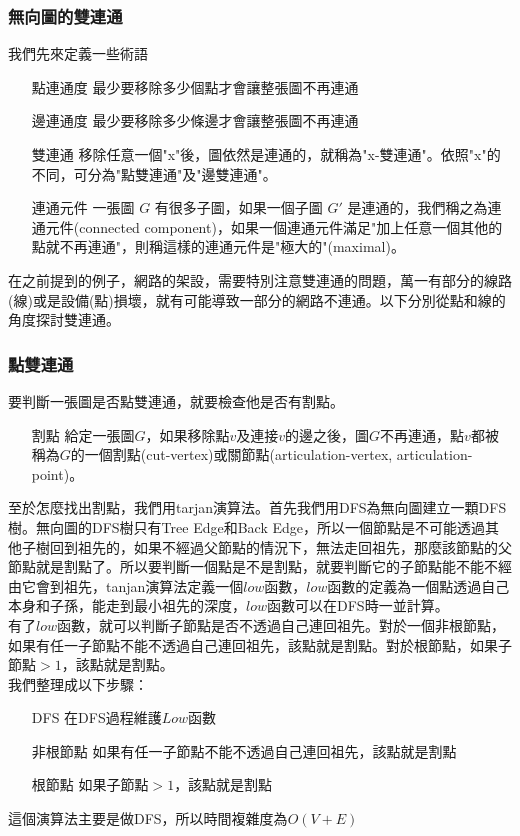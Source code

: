 \subsubsection{無向圖的雙連通}
我們先來定義一些術語
\begin{enumerate}
\item [點連通度] 最少要移除多少個點才會讓整張圖不再連通
\item [邊連通度] 最少要移除多少條邊才會讓整張圖不再連通
\item [雙連通] 移除任意一個"x"後，圖依然是連通的，就稱為"x-雙連通"。依照"x"的不同，可分為"點雙連通"及"邊雙連通"。
\item [連通元件] 一張圖 $G$ 有很多子圖，如果一個子圖 $G'$ 是連通的，我們稱之為連通元件(connected component)，如果一個連通元件滿足"加上任意一個其他的點就不再連通"，則稱這樣的連通元件是"極大的"(maximal)。
\end{enumerate}
在之前提到的例子，網路的架設，需要特別注意雙連通的問題，萬一有部分的線路(線)或是設備(點)損壞，就有可能導致一部分的網路不連通。以下分別從點和線的角度探討雙連通。
\subsubsection{點雙連通}
要判斷一張圖是否點雙連通，就要檢查他是否有割點。
\begin{enumerate}
\item [割點] 給定一張圖$G$，如果移除點$v$及連接$v$的邊之後，圖$G$不再連通，點$v$都被稱為$G$的一個割點(cut-vertex)或關節點(articulation-vertex, articulation-point)。
\end{enumerate}
至於怎麼找出割點，我們用tarjan演算法。首先我們用DFS為無向圖建立一顆DFS樹。無向圖的DFS樹只有Tree Edge和Back Edge，所以一個節點是不可能透過其他子樹回到祖先的，如果不經過父節點的情況下，無法走回祖先，那麼該節點的父節點就是割點了。所以要判斷一個點是不是割點，就要判斷它的子節點能不能不經由它會到祖先，tanjan演算法定義一個$low$函數，$low$函數的定義為一個點透過自己本身和子孫，能走到最小祖先的深度，$low$函數可以在DFS時一並計算。\\
有了$low$函數，就可以判斷子節點是否不透過自己連回祖先。對於一個非根節點，如果有任一子節點不能不透過自己連回祖先，該點就是割點。對於根節點，如果子節點$>1$，該點就是割點。\\
我們整理成以下步驟：
\begin{enumerate}
\item [DFS] 在DFS過程維護$Low$函數
\item [非根節點] 如果有任一子節點不能不透過自己連回祖先，該點就是割點
\item [根節點] 如果子節點$>1$，該點就是割點
\end{enumerate}

這個演算法主要是做DFS，所以時間複雜度為$O(V+E)$

